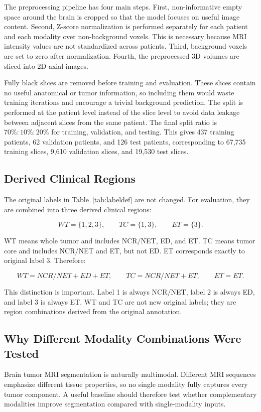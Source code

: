 The preprocessing pipeline has four main steps. First, non-informative empty space around the brain is cropped so that the model focuses on useful image content. Second, Z-score normalization is performed separately for each patient and each modality over non-background voxels. This is necessary because MRI intensity values are not standardized across patients. Third, background voxels are set to zero after normalization. Fourth, the preprocessed 3D volumes are sliced into 2D axial images.

Fully black slices are removed before training and evaluation. These slices contain no useful anatomical or tumor information, so including them would waste training iterations and encourage a trivial background prediction. The split is performed at the patient level instead of the slice level to avoid data leakage between adjacent slices from the same patient. The final split ratio is \(70\%:10\%:20\%\) for training, validation, and testing. This gives 437 training patients, 62 validation patients, and 126 test patients, corresponding to 67,735 training slices, 9,610 validation slices, and 19,530 test slices.

\subsection{Derived Clinical Regions}

The original labels in Table~\ref{tab:labeldef} are not changed. For evaluation, they are combined into three derived clinical regions:

\[
WT=\{1,2,3\}, \qquad TC=\{1,3\}, \qquad ET=\{3\}.
\]

WT means whole tumor and includes NCR/NET, ED, and ET. TC means tumor core and includes NCR/NET and ET, but not ED. ET corresponds exactly to original label 3. Therefore:

\[
WT = NCR/NET + ED + ET, \qquad
TC = NCR/NET + ET, \qquad
ET = ET.
\]

This distinction is important. Label 1 is always NCR/NET, label 2 is always ED, and label 3 is always ET. WT and TC are not new original labels; they are region combinations derived from the original annotation.

\subsection{Why Different Modality Combinations Were Tested}

Brain tumor MRI segmentation is naturally multimodal. Different MRI sequences emphasize different tissue properties, so no single modality fully captures every tumor component. A useful baseline should therefore test whether complementary modalities improve segmentation compared with single-modality inputs.

